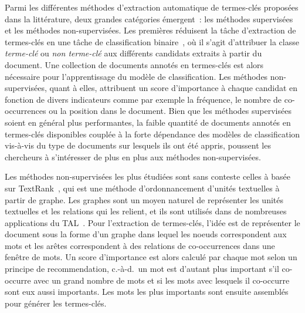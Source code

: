   Parmi les différentes méthodes d'extraction automatique de termes-clés proposées dans la littérature, deux grandes catégories émergent~: les méthodes supervisées et les méthodes non-supervisées.
  Les premières réduisent la tâche d'extraction de termes-clés en une tâche de classification binaire~\cite{witten1999kea}, où il s'agit d'attribuer la classe \og{}\textit{terme-clé}\fg{} ou \og{}\textit{non terme-clé}\fg{} aux différents candidats extraits à partir du document.
  Une collection de documents annotés en termes-clés est alors nécessaire pour l'apprentissage du modèle de classification.
  Les méthodes non-supervisées, quant à elles, attribuent un score d'importance à chaque candidat en fonction de divers indicateurs comme par exemple la fréquence, le nombre de co-occurrences ou la position dans le document.
  Bien que les méthodes supervisées soient en général plus performantes, la faible quantité de documents annotés en termes-clés disponibles couplée à la forte dépendance des modèles de classification vis-à-vis du type de documents sur lesquels ils ont été appris, poussent les chercheurs à s'intéresser de plus en plus aux méthodes non-supervisées.

  Les méthodes non-supervisées les plus étudiées sont sans conteste celles à basée sur TextRank~\cite{mihalcea2004textrank}, qui est une méthode d'ordonnancement d'unités textuelles à partir de graphe.
  Les graphes sont un moyen naturel de représenter les unités textuelles et les relations qui les relient, et ils sont utilisés dans de nombreuses applications du TAL~\cite{textgraphs2013}.
  Pour l'extraction de termes-clés, l'idée est de représenter le document sous la forme d'un graphe dans lequel les noeuds correspondent aux mots et les arêtes correspondent à des relations de co-occurrences dans une fenêtre de mots.
  Un score d'importance est alors calculé par chaque mot selon un principe de recommendation, c.-à-d.~un mot est d'autant plus important s'il co-occurre avec un grand nombre de mots et si les mots avec lesquels il co-occurre sont eux aussi importants.
  Les mots les plus importants sont ensuite assemblés pour générer les termes-clés.

